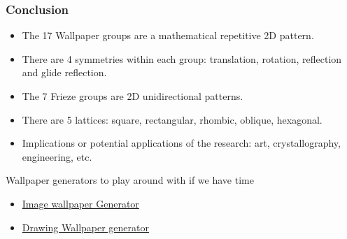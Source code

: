 \documentclass{beamer}
\theoremstyle{definition}
\begin{document}
\begin{frame}
  \frametitle{Conclusion}
  \begin{itemize}
    \item The 17 Wallpaper groups are a mathematical repetitive 2D pattern.
    \item There are 4 symmetries within each group: translation, rotation, reflection and glide reflection.
    \item The 7 Frieze groups are 2D unidirectional patterns.
    \item There are 5 lattices: square, rectangular, rhombic, oblique, hexagonal. 
    \item Implications or potential applications of the research: art, crystallography, engineering, etc.
  \end{itemize}
\end{frame}
\begin{frame}{Wallpaper generators to play around with if we have time}
\begin{itemize}
    \item  \href{https://singsurf.org/wallpaper/wallpaper.php?FILENAME=101837470_6beae39fe1.jpg}{Image wallpaper Generator}
    \item \href{https://math.hws.edu/eck/js/symmetry/wallpaper.html}{Drawing Wallpaper generator}
\end{itemize}
    
\end{frame}
\end{document}
